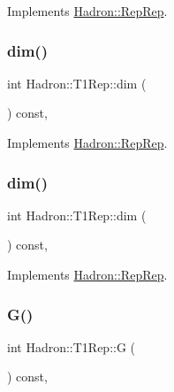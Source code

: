 Implements \mbox{\hyperlink{structHadron_1_1RepRep_a92c8802e5ed7afd7da43ccfd5b7cd92b}{Hadron\+::\+Rep\+Rep}}.

\mbox{\label{structHadron_1_1T1Rep_aa5fae2d46d90d11f94ed0b78626e7758}} 
\subsubsection{\texorpdfstring{dim()}{dim()}\hspace{0.1cm}{\footnotesize\ttfamily [2/3]}}
{\footnotesize\ttfamily int Hadron\+::\+T1\+Rep\+::dim (\begin{DoxyParamCaption}{ }\end{DoxyParamCaption}) const\hspace{0.3cm}{\ttfamily [inline]}, {\ttfamily [virtual]}}



Implements \mbox{\hyperlink{structHadron_1_1RepRep_a92c8802e5ed7afd7da43ccfd5b7cd92b}{Hadron\+::\+Rep\+Rep}}.

\mbox{\label{structHadron_1_1T1Rep_aa5fae2d46d90d11f94ed0b78626e7758}} 
\subsubsection{\texorpdfstring{dim()}{dim()}\hspace{0.1cm}{\footnotesize\ttfamily [3/3]}}
{\footnotesize\ttfamily int Hadron\+::\+T1\+Rep\+::dim (\begin{DoxyParamCaption}{ }\end{DoxyParamCaption}) const\hspace{0.3cm}{\ttfamily [inline]}, {\ttfamily [virtual]}}



Implements \mbox{\hyperlink{structHadron_1_1RepRep_a92c8802e5ed7afd7da43ccfd5b7cd92b}{Hadron\+::\+Rep\+Rep}}.

\mbox{\label{structHadron_1_1T1Rep_a824c17669ccaf2513c03a3b41a25108e}} 
\subsubsection{\texorpdfstring{G()}{G()}\hspace{0.1cm}{\footnotesize\ttfamily [1/2]}}
{\footnotesize\ttfamily int Hadron\+::\+T1\+Rep\+::G (\begin{DoxyParamCaption}{ }\end{DoxyParamCaption}) const\hspace{0.3cm}{\ttfamily [inline]}, {\ttfamily [virtual]}}

